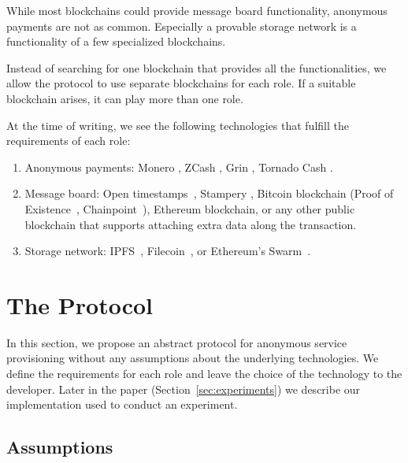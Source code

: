 While most blockchains could provide message board functionality, anonymous payments are not as common. Especially a provable storage network is a functionality of a few specialized blockchains.

Instead of searching for one blockchain that provides all the functionalities, we allow the protocol to use separate blockchains for each role. If a suitable blockchain arises, it can play more than one role.

At the time of writing, we see the following technologies that fulfill the requirements of each role:

\begin{enumerate}
\def\labelenumi{\arabic{enumi}.}

\item Anonymous payments: Monero \cite{vansaberhagenCryptoNote2013}, ZCash
  \cite{ben-sassonZerocashDecentralizedAnonymous2014}, Grin \cite{fuchsbauerAggregateCashSystems2019},
  Tornado Cash \cite{pertsevTornadoCashPrivacy2019}.
\item Message board: Open timestamps~\cite{opentimestampsTimestampingProofStandard}, Stampery \cite{crespoStamperyBlockchainTimestamping2017}, Bitcoin blockchain (Proof of Existence~\cite{proofofexistenceWebApplicationProve}, Chainpoint~\cite{chainpointBlockchainProofAnchoring}), Ethereum blockchain, or any other public blockchain that supports attaching extra data along the transaction.
\item Storage network: IPFS~\cite{benetIPFSContentAddressed2014}, Filecoin~\cite{protocollabsFilecoinDecentralizedStorage2017}, or Ethereum's
  Swarm~\cite{teamSWARMStorageCommunication2021}.
\end{enumerate}

\section{The Protocol}\label{sec:protocol}
In this section, we propose an abstract protocol for anonymous service provisioning without any assumptions about the underlying technologies. We define the requirements for each role and leave the choice of the technology to the developer. Later in the paper (Section~\ref{sec:experiments}) we describe our implementation used to conduct an experiment.

\subsection{Assumptions}

